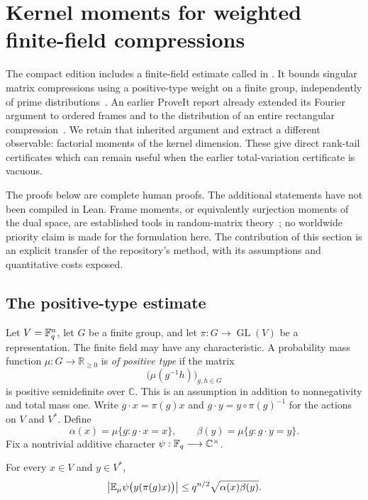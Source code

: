 \section{Kernel moments for weighted finite-field compressions}
\label{sec:rank-moments}

The compact edition includes a finite-field estimate called
 in
.
It bounds singular matrix compressions using a positive-type weight on a
finite group, independently of prime distributions~\cite{repo}.
An earlier ProveIt report already extended its Fourier argument to ordered
frames and to the distribution of an entire rectangular
compression~\cite{priorSymplectic}. We retain that inherited argument and
extract a different observable: factorial moments of the kernel dimension.
These give direct rank-tail certificates which can remain useful when the
earlier total-variation certificate is vacuous.

The proofs below are complete human proofs. The additional statements have
not been compiled in Lean. Frame moments, or equivalently surjection moments
of the dual space, are established tools in random-matrix
theory~\cite{wood,fulman}; no worldwide priority claim is made for the
formulation here. The contribution of this section is an explicit transfer
of the repository's method, with its assumptions and quantitative costs
exposed.

\subsection{The positive-type estimate}

Let $V=\mathbb F_q^n$, let $G$ be a finite group, and let
$\pi:G\longrightarrow\operatorname{GL}(V)$ be a representation. The finite
field may have any characteristic. A probability mass function
$\mu:G\longrightarrow\mathbb R_{\ge0}$ is \emph{of positive type} if the
matrix
\[
 \bigl(\mu(g^{-1}h)\bigr)_{g,h\in G}
\]
is positive semidefinite over $\mathbb C$. This is an assumption in addition
to nonnegativity and total mass one. Write $g\cdot x=\pi(g)x$ and
$g\cdot y=y\circ\pi(g)^{-1}$ for the actions on $V$ and $V^*$. Define
\[
 \alpha(x)=\mu\{g:g\cdot x=x\},\qquad
 \beta(y)=\mu\{g:g\cdot y=y\}.
\]
Fix a nontrivial additive character
$\psi:\mathbb F_q\longrightarrow\mathbb C^\times$.

\begin{lemma}
\label{lem:positive-coefficient}
For every $x\in V$ and $y\in V^*$,
\[
 \left|\mathbb E_\mu\psi\bigl(y(\pi(g)x)\bigr)\right|
 \le q^{n/2}\sqrt{\alpha(x)\beta(y)}.
\]
\end{lemma}

